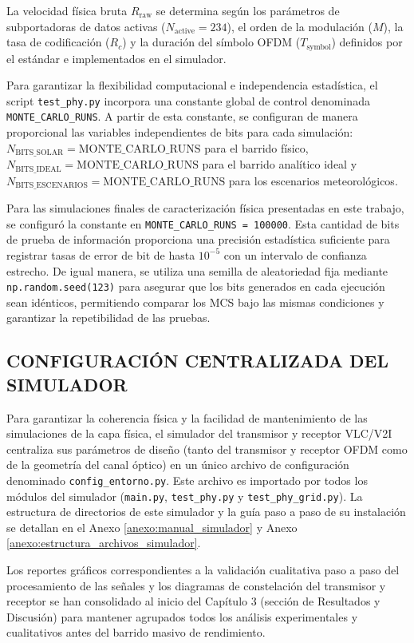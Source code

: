 La velocidad física bruta $R_{\text{raw}}$ se determina según los parámetros de subportadoras de datos activas ($N_{\text{active}} = 234$), el orden de la modulación ($M$), la tasa de codificación ($R_c$) y la duración del símbolo OFDM ($T_{\text{symbol}}$) definidos por el estándar e implementados en el simulador.


Para garantizar la flexibilidad computacional e independencia estadística, el script \texttt{test\_phy.py} incorpora una constante global de control denominada \texttt{MONTE\_CARLO\_RUNS}. A partir de esta constante, se configuran de manera proporcional las variables independientes de bits para cada simulación: $N_{\text{BITS\_SOLAR}} = \text{MONTE\_CARLO\_RUNS}$ para el barrido físico, $N_{\text{BITS\_IDEAL}} = \text{MONTE\_CARLO\_RUNS}$ para el barrido analítico ideal y $N_{\text{BITS\_ESCENARIOS}} = \text{MONTE\_CARLO\_RUNS}$ para los escenarios meteorológicos. 

Para las simulaciones finales de caracterización física presentadas en este trabajo, se configuró la constante en \texttt{MONTE\_CARLO\_RUNS = 100000}. Esta cantidad de bits de prueba de información proporciona una precisión estadística suficiente para registrar tasas de error de bit de hasta $10^{-5}$ con un intervalo de confianza estrecho. De igual manera, se utiliza una semilla de aleatoriedad fija mediante \texttt{np.random.seed(123)} para asegurar que los bits generados en cada ejecución sean idénticos, permitiendo comparar los MCS bajo las mismas condiciones y garantizar la repetibilidad de las pruebas.

\subsection{CONFIGURACIÓN CENTRALIZADA DEL SIMULADOR}
Para garantizar la coherencia física y la facilidad de mantenimiento de las simulaciones de la capa física, el simulador del transmisor y receptor VLC/V2I centraliza sus parámetros de diseño (tanto del transmisor y receptor OFDM como de la geometría del canal óptico) en un único archivo de configuración denominado \texttt{config\_entorno.py}. Este archivo es importado por todos los módulos del simulador (\texttt{main.py}, \texttt{test\_phy.py} y \texttt{test\_phy\_grid.py}). La estructura de directorios de este simulador y la guía paso a paso de su instalación se detallan en el Anexo \ref{anexo:manual_simulador} y Anexo \ref{anexo:estructura_archivos_simulador}.

Los reportes gráficos correspondientes a la validación cualitativa paso a paso del procesamiento de las señales y los diagramas de constelación del transmisor y receptor se han consolidado al inicio del Capítulo 3 (sección de Resultados y Discusión) para mantener agrupados todos los análisis experimentales y cualitativos antes del barrido masivo de rendimiento.
